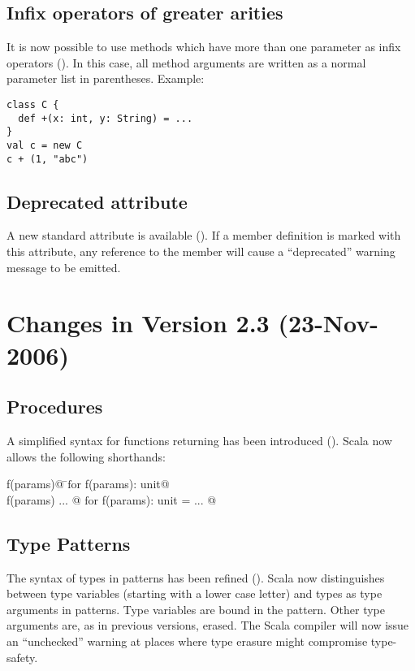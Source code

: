 \subsection*{Infix operators of greater arities}

It is now possible to use methods which have more than one parameter
as infix operators (). In this case, all
method arguments are written as a normal parameter list in parentheses. Example:
\begin{lstlisting}
class C {
  def +(x: int, y: String) = ...
}
val c = new C
c + (1, "abc")
\end{lstlisting}

\subsection*{Deprecated attribute}

A new standard attribute \lstinline@deprecated@ is available (). If a
member definition is marked with this attribute, any reference to the
member will cause a ``deprecated'' warning message to be emitted.

\section*{Changes in Version 2.3 (23-Nov-2006)}

\subsection*{Procedures} A simplified syntax for functions returning
\lstinline@unit@ has been introduced (). 
Scala now allows the following shorthands:

\begin{tabbing}
\lstinline@def f(params)@     \tab\tab\tab \=$\mbox{for}$  \tab
\lstinline@def f(params): unit@ \\
\lstinline@def f(params) { ... }@  \>$\mbox{for}$    \tab
\lstinline@def f(params): unit = { ... }@
\end{tabbing}

\subsection*{Type Patterns} The syntax of types in patterns has been 
refined (). Scala now distinguishes between
type variables (starting with a lower case letter) and types as type
arguments in patterns.  Type variables are bound in the pattern. Other
type arguments are, as in previous versions, erased. The Scala
compiler will now issue an ``unchecked'' warning at places where type
erasure might compromise type-safety.

